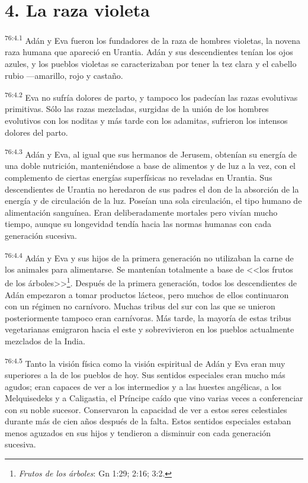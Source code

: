 \section*{4. La raza violeta}
\par
\textsuperscript{76:4.1} Adán y Eva fueron los fundadores de la raza de hombres violetas, la novena raza humana que apareció en Urantia. Adán y sus descendientes tenían los ojos azules, y los pueblos violetas se caracterizaban por tener la tez clara y el cabello rubio ---amarillo, rojo y castaño.

\par
\textsuperscript{76:4.2} Eva no sufría dolores de parto, y tampoco los padecían las razas evolutivas primitivas. Sólo las razas mezcladas, surgidas de la unión de los hombres evolutivos con los noditas y más tarde con los adamitas, sufrieron los intensos dolores del parto.

\par
\textsuperscript{76:4.3} Adán y Eva, al igual que sus hermanos de Jerusem, obtenían su energía de una doble nutrición, manteniéndose a base de alimentos y de luz a la vez, con el complemento de ciertas energías superfísicas no reveladas en Urantia. Sus descendientes de Urantia no heredaron de sus padres el don de la absorción de la energía y de circulación de la luz. Poseían una sola circulación, el tipo humano de alimentación sanguínea. Eran deliberadamente mortales pero vivían mucho tiempo, aunque su longevidad tendía hacia las normas humanas con cada generación sucesiva.

\par
\textsuperscript{76:4.4} Adán y Eva y sus hijos de la primera generación no utilizaban la carne de los animales para alimentarse. Se mantenían totalmente a base de <<los frutos de los árboles>>\footnote{\textit{Frutos de los árboles}: Gn 1:29; 2:16; 3:2.}. Después de la primera generación, todos los descendientes de Adán empezaron a tomar productos lácteos, pero muchos de ellos continuaron con un régimen no carnívoro. Muchas tribus del sur con las que se unieron posteriormente tampoco eran carnívoras. Más tarde, la mayoría de estas tribus vegetarianas emigraron hacia el este y sobrevivieron en los pueblos actualmente mezclados de la India.

\par
\textsuperscript{76:4.5} Tanto la visión física como la visión espiritual de Adán y Eva eran muy superiores a la de los pueblos de hoy. Sus sentidos especiales eran mucho más agudos; eran capaces de ver a los intermedios y a las huestes angélicas, a los Melquisedeks y a Caligastia, el Príncipe caído que vino varias veces a conferenciar con su noble sucesor. Conservaron la capacidad de ver a estos seres celestiales durante más de cien años después de la falta. Estos sentidos especiales estaban menos aguzados en sus hijos y tendieron a disminuir con cada generación sucesiva.

